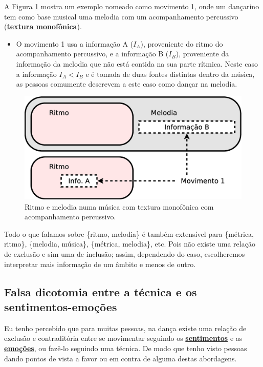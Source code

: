 \begin{example}
\label{ex:ritmovsmelodia2}
A Figura \ref{fig:ritmo-melodia-2} mostra um exemplo nomeado como movimento 1,
onde um dançarino tem como base musical uma melodia com um acompanhamento percussivo 
(\hyperref[subsec:monofonica]{\textbf{textura monofônica}}).
\begin{itemize}
\item O movimento 1 usa a informação A ($I_{A}$), proveniente do ritmo do acompanhamento percussivo,
e a informação B ($I_{B}$), proveniente da informação da melodia que não está contida na sua parte rítmica.
Neste caso a informação $I_A < I_B$ e é tomada de duas fontes distintas dentro da música, 
 as pessoas comumente descrevem a este caso como dançar na melodia. 
\end{itemize}
\end{example}
\begin{figure}[h!]
\centering
      \includegraphics[width=.6\linewidth]{chapters/cap-musicalidade-tecnica/ritmo-melodia-2}  
      \caption{Ritmo e melodia numa música com textura monofônica com acompanhamento percussivo.}
      \label{fig:ritmo-melodia-2}
\end{figure}



Todo o que falamos sobre  \{ritmo, melodia\} é também extensível para 
\{métrica, ritmo\}, \{melodia, música\}, \{métrica, melodia\}, etc.
Pois não existe uma relação de exclusão e sim uma de inclusão;
assim, dependendo do caso, 
escolheremos interpretar mais informação de um âmbito e menos de outro.







\subsection{Falsa dicotomia entre a técnica e os sentimentos-emoções}
\label{subsec:tecnica-sentimentos}
Eu tenho percebido que para muitas pessoas, na dança existe uma relação de exclusão e contraditória 
entre se movimentar seguindo os \hyperref[subsec:filling]{\textbf{sentimentos}} e as 
\hyperref[subsec:emotion]{\textbf{emoções}},
ou fazê-lo seguindo uma técnica. 
De modo que tenho visto pessoas dando pontos de vista a favor ou em contra de alguma destas abordagens.

